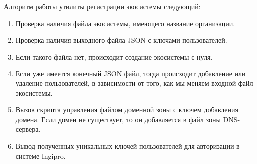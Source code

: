 Алгоритм работы утилиты регистрации экосистемы следующий:
\begin{enumerate}
	\item Проверка наличия файла экосистемы, имеющего название организации.
	\item Проверка наличия выходного файла JSON с ключами пользователей.
	\item Если такого файла нет, происходит создание экосистемы с нуля.
	\item Если уже имеется конечный JSON файл, тогда происходит добавление или удаление пользователей, в зависимости от того, как мы меняем входной файл экосистемы.
	\item Вызов скрипта управления файлом доменной зоны с ключем добавления домена. Если домен не существует, то он добавляется в файл зоны DNS-сервера.
	\item Вывод полученных уникальных ключей пользователей для авторизации в системе Ingipro.
\end{enumerate}
